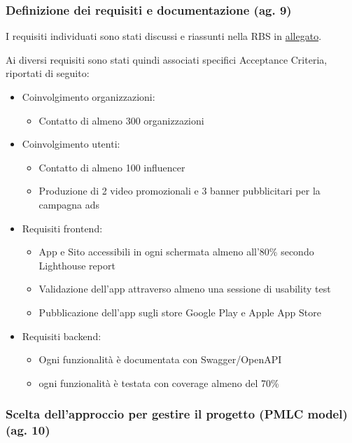 \documentclass[11pt,a4paper]{article}
\providecommand{\tightlist}{\setlength{\itemsep}{0pt}\setlength{\parskip}{0pt}}
\begin{document}
\subsubsection{\texorpdfstring{{Definizione dei requisiti e documentazione (ag. 9)}}{Definizione dei requisiti e documentazione (ag. 9)}}\label{h.v5zosoywpqxe}

{I requisiti individuati sono stati discussi e riassunti nella RBS in \hyperref[sec:rbs]{allegato}.}

{Ai diversi requisiti sono stati quindi associati specifici Acceptance Criteria, riportati di seguito:}
\begin{itemize}
\tightlist
\item {Coinvolgimento organizzazioni:}
  \begin{itemize}
  \tightlist
  \item {Contatto di almeno 300 organizzazioni}
  \end{itemize}
\item {Coinvolgimento utenti:}
  \begin{itemize}
  \tightlist
  \item {Contatto di almeno 100 influencer}
  \item {Produzione di 2 video promozionali e 3 banner pubblicitari per la campagna ads}
  \end{itemize}
\item {Requisiti frontend:}
  \begin{itemize}
  \tightlist
  \item {App e Sito accessibili in ogni schermata almeno all’80\% secondo Lighthouse report}
  \item {Validazione dell’app attraverso almeno una sessione di usability test}
  \item {Pubblicazione dell’app sugli store Google Play e Apple App Store}
  \end{itemize}
\item {Requisiti backend:}
  \begin{itemize}
  \tightlist
  \item {Ogni funzionalità è documentata con Swagger/OpenAPI}
  \item {ogni funzionalità è testata con coverage almeno del 70\%}
  \end{itemize}
\end{itemize}

\subsubsection{\texorpdfstring{{Scelta dell’approccio per gestire il progetto (PMLC model) (ag. 10)}}{Scelta dell’approccio per gestire il progetto (PMLC model) (ag. 10)}}\label{h.ce7nvwrbo5wp}
\end{document}
